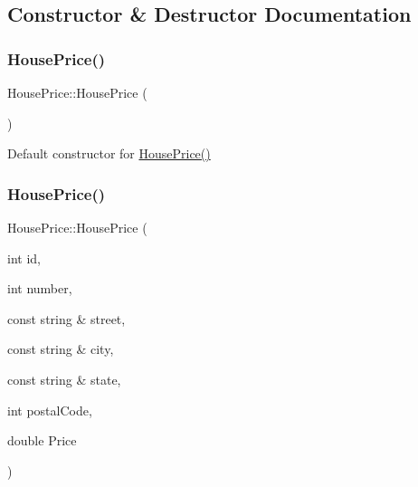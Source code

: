 \subsection{Constructor \& Destructor Documentation}
\mbox{\label{class_house_price_adc911972c42bb19d1482fc260f339800}} 
\subsubsection{\texorpdfstring{House\+Price()}{HousePrice()}\hspace{0.1cm}{\footnotesize\ttfamily [1/2]}}
{\footnotesize\ttfamily House\+Price\+::\+House\+Price (\begin{DoxyParamCaption}{ }\end{DoxyParamCaption})}

Default constructor for \hyperlink{class_house_price_adc911972c42bb19d1482fc260f339800}{House\+Price()} \mbox{\label{class_house_price_a505a9a7d3f8bd563597110e21aefa29a}} 
\subsubsection{\texorpdfstring{House\+Price()}{HousePrice()}\hspace{0.1cm}{\footnotesize\ttfamily [2/2]}}
{\footnotesize\ttfamily House\+Price\+::\+House\+Price (\begin{DoxyParamCaption}\item[{int}]{id,  }\item[{int}]{number,  }\item[{const string \&}]{street,  }\item[{const string \&}]{city,  }\item[{const string \&}]{state,  }\item[{int}]{postal\+Code,  }\item[{double}]{Price }\end{DoxyParamCaption})}


